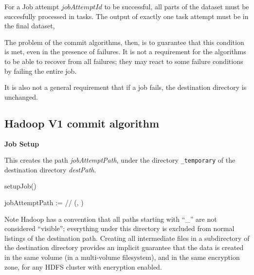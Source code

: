 \documentclass[conference]{IEEEtran}
\begin{document}
For a Job attempt $jobAttemptId$ to be successful, all parts of the dataset
must be succesfully processed in tasks.
The output of exactly one task attempt must be in the final dataset,

The problem of the commit algorithms, then, is to guarantee that this condition
is met, even in the presence of failures.
It is not a requirement for the algorithms to be able to recover from all
failures;
they may react to some failure conditions by failing the entire job.

It is also not a general requirement that if a job fails, the destination directory
is unchanged.

\subsection{Hadoop V1 commit algorithm}
\label{subsec:hadoopV1CommitAlgorithm}


\textbf{Job Setup}

This creates the path \emph{jobAttemptPath}, under the
directory \texttt{\_temporary} of the destination directory
\emph{destPath}.

\begin{procedure}
\caption{setupJob()}


jobAttemptPath := \dest/\temp/\jobAttemptId\;
  \mkdir(\fs, \jobAttemptPath)\;
\end{procedure}

Note Hadoop has a convention that all paths starting with ``\_'' are not considered
``visible'';
everything under this directory is excluded from normal
listings of the destination path.
Creating all intermediate files in a subdirectory of the destination
directory provides an implicit guarantee that the data is created in the
same volume (in a multi-volume filesystem), and in the same encryption zone,
for any HDFS cluster with encryption enabled.
\end{document}
